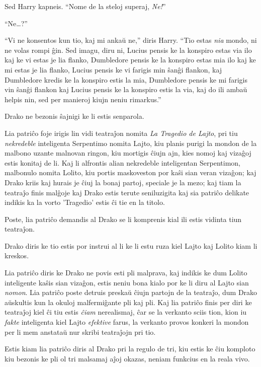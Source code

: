 Sed Harry kapneis. ``Nome de la steloj superaj, \emph{Ne!}''

``Ne\ldots{}?''

``Vi ne konsentos kun tio, kaj mi ankaŭ ne,'' diris Harry. ``Tio estas
\emph{nia} mondo, ni ne volas rompi ĝin. Sed imagu, diru ni, Lucius
pensis ke la konspiro estas via ilo kaj ke vi estas je lia flanko,
Dumbledore pensis ke la konspiro estas mia ilo kaj ke mi estas je lia
flanko, Lucius pensis ke vi farigis min ŝanĝi flankon, kaj Dumbledore
kredis ke la konspiro estis la mia, Dumbledore pensis ke mi farigis
vin ŝanĝi flankon kaj Lucius pensis ke la konspiro estis la via, kaj
do ili ambaŭ helpis nin, sed per manieroj kiujn neniu rimarkus.''

Drako ne bezonis ŝajnigi ke li estis senparola.

Lia patriĉo foje irigis lin vidi teatraĵon nomita \emph{La Tragedio de
  Lajto}, pri tiu \emph{nekredeble} inteligenta Serpentimo nomita
Lajto, kiu planis purigi la mondon de la malbono uzante malnovan ringon, kiu
mortigis ĉiujn ajn, kies nomoj kaj vizaĝoj estis konitaj de li. Kaj li
alfrontis alian nekredeble inteligentan Serpentimon, malbonulo nomita
Lolito, kiu portis maskoveston por kaŝi sian veran vizaĝon; kaj Drako
kriis kaj hurais je ĉiuj la bonaj partoj, speciale je la mezo; kaj tiam
la teatraĵo finis malĝoje kaj Drako estis terute seniluzigita kaj sia
patriĉo delikate indikis ka la vorto 'Tragedio' estis ĉi tie en la
titolo.

Poste, lia patriĉo demandis al Drako se li komprenis kial ili estis vidinta tiun teatraĵon.

Drako diris ke tio estis por instrui al li ke li estu ruza kiel Lajto kaj Lolito kiam li kreskos.

Lia patriĉo diris ke Drako ne povis esti pli malprava, kaj indikis ke
dum Lolito inteligente kaŝis sian vizaĝon, estis neniu bona kialo por
ke li diru al Lajto sian \emph{nomon}. Lia patriĉo poste detruis
preskaŭ ĉiujn partojn de la teatraĵo, dum Drako aŭskultis kun la
okuloj malfermiĝante pli kaj pli. Kaj lia patriĉo finis per diri ke
teatraĵoj kiel ĉi tiu estis \emph{ĉiam} nerealismaj, ĉar se la
verkanto sciis tion, kion iu \emph{fakte} inteligenta kiel Lajto
\emph{efektive} farus, la verkanto provos konkeri la mondon per li mem
anstataŭ nur skribi teatraĵojn pri tio.

Estis kiam lia patriĉo diris al Drako pri la regulo de tri, kiu estis
ke ĉiu komploto kiu bezonis ke pli ol tri malsamaj aĵoj okazas, neniam
funkcius en la reala vivo.

